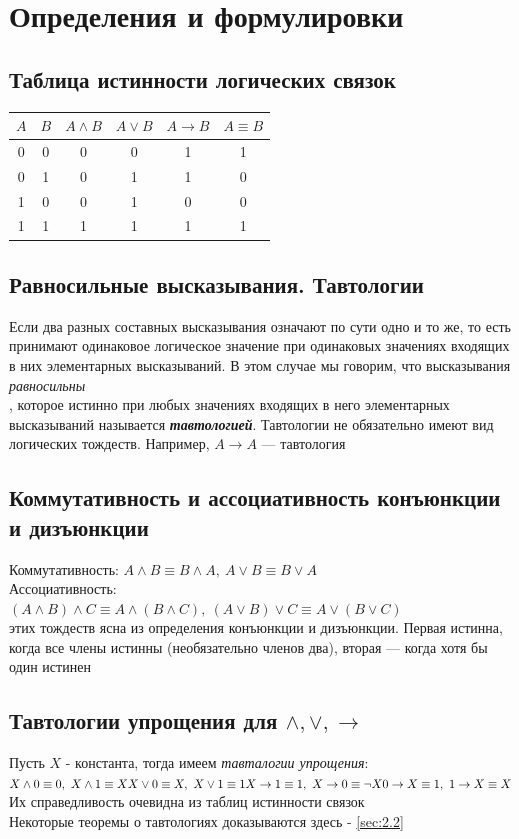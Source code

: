 \documentclass[a4paper]{article}
\begin{document}
\tableofcontents

\newpage
\section{Определения и формулировки}
\subsection{Таблица истинности логических связок}

\begin{tabular}{|c|c|c|c|c|c|}
\hline
$A$ & $B$ & $A\wedge B$ & $A\vee B$ & $A\rightarrow B$ & $A\equiv B$ \\
\hline
0 & 0 & 0 & 0 & 1 & 1 \\
\hline
0 & 1 & 0 & 1 & 1 & 0 \\
\hline
1 & 0 & 0 & 1 & 0 & 0 \\
\hline
1 & 1 & 1 & 1 & 1 & 1 \\
\hline
\end{tabular}
\subsection{Равносильные высказывания. Тавтологии}
Если два разных составных высказывания означают по сути одно и то же, то есть принимают одинаковое логическое значение при одинаковых значениях входящих в них элементарных высказываний. В этом случае мы говорим, что высказывания \textit{равносильны}\\[2mm]
, которое истинно при любых значениях входящих в него элементарных высказываний называется \textit{\textbf{тавтологией}}. Тавтологии не обязательно имеют вид логических тождеств. Например, $A\rightarrow A$ — тавтология
\subsection{Коммутативность и ассоциативность конъюнкции и дизъюнкции}
Коммутативность: $A\wedge B\equiv B\wedge A,\ A\vee B\equiv B\vee A$\\[2mm]
Ассоциативность: $(A\wedge B)\wedge C\equiv A\wedge (B\wedge C),\ (A\vee B)\vee C\equiv A\vee (B\vee C)$\\[2mm]
 этих тождеств ясна из  определения конъюнкции и дизъюнкции. Первая истинна, когда все члены истинны (необязательно членов два), вторая — когда хотя бы один истинен
\subsection{Тавтологии упрощения для $\wedge, \vee, \rightarrow$}
Пусть $X$ - константа, тогда имеем \textit{тавталогии упрощения}:\\[2mm]
$X\wedge 0\equiv 0,\ X\wedge 1\equiv X\\[2mm]
X\vee 0\equiv X,\ X\vee 1\equiv 1\\[2mm]
X\rightarrow1\equiv1,\ X\rightarrow0\equiv\neg X\\[2mm]
0\rightarrow X\equiv1,\ 1\rightarrow X\equiv X\\[2mm]$
Их справедливость очевидна из таблиц истинности связок\\[2mm]
Некоторые теоремы о тавтологиях доказываются здесь - \ref{sec:2.2}
\end{document}
